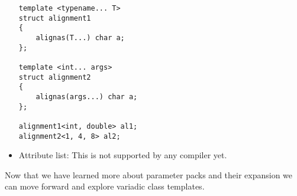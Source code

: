 \begin{itemize}
\begin{lstlisting}[style=styleCXX]
template <typename... T>
struct alignment1
{
	alignas(T...) char a;
};

template <int... args>
struct alignment2
{
	alignas(args...) char a;
};

alignment1<int, double> al1;
alignment2<1, 4, 8> al2;
\end{lstlisting}

\item
Attribute list: This is not supported by any compiler yet.
\end{itemize}

Now that we have learned more about parameter packs and their expansion we can move forward and explore variadic class templates.








